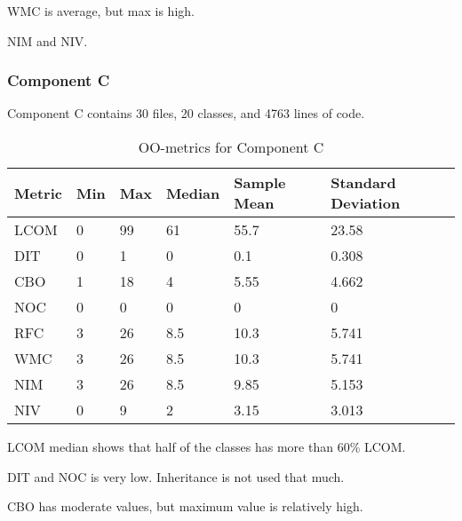 WMC is average, but max is high. 

NIM and NIV. 






\subsubsection{Component C}
Component C contains 30 files, 20 classes, and 4763 lines of code. 
\begin{table}[]
\centering
\caption{OO-metrics for Component C}
\label{tab:oometrics-config}
\begin{tabular}{|l|l|l|l|l|l|}
\hline
\textbf{Metric} & \textbf{Min} & \textbf{Max} & \textbf{Median} & \textbf{Sample Mean} & \textbf{Standard Deviation} \\ \hline
LCOM            & 0            & 99           & 61              & 55.7                 & 23.58                       \\ \hline
DIT             & 0            & 1            & 0               & 0.1                  & 0.308                       \\ \hline
CBO             & 1            & 18           & 4               & 5.55                 & 4.662                       \\ \hline
NOC             & 0            & 0            & 0               & 0                    & 0                           \\ \hline
RFC             & 3            & 26           & 8.5             & 10.3                 & 5.741                       \\ \hline
WMC             & 3            & 26           & 8.5             & 10.3                 & 5.741                       \\ \hline
NIM             & 3            & 26           & 8.5             & 9.85                 & 5.153                       \\ \hline
NIV             & 0            & 9            & 2               & 3.15                 & 3.013                       \\ \hline
\end{tabular}
\end{table}

LCOM median shows that half of the classes has more than 60\% LCOM. 

DIT and NOC is very low. Inheritance is not used that much. 

CBO has moderate values, but maximum value is relatively high. 

